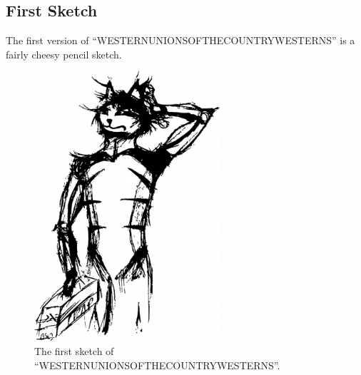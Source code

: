 \documentclass{report}
\newcommand\imageheight{10cm}
\begin{document}
\subsection{First Sketch}
The first version of ``WESTERNUNIONSOFTHECOUNTRYWESTERNS'' is a fairly cheesy pencil sketch.
\begin{figure}[ht]
	\centering
	\includegraphics[height=\imageheight]{50x/toolbox/s1v1.jpg}
	\caption[center]{The first sketch of ``WESTERNUNIONSOFTHECOUNTRYWESTERNS''.}
\end{figure}
\end{document}
